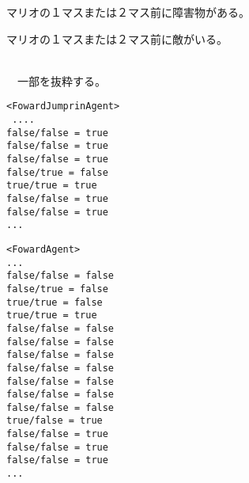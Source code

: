 \documentclass[a4j]{jarticle}
\begin{document}
\begin{description}
\begin{description}
\begin{description}
      \item マリオの１マスまたは２マス前に障害物がある。
      \item マリオの１マスまたは２マス前に敵がいる。
      \end{description}
  \end{description}
\item[(3)]~\\
　一部を抜粋する。
\begin{verbatim}
<FowardJumprinAgent>
 ....
false/false = true
false/false = true
false/false = true
false/true = false
true/true = true
false/false = true
false/false = true
...
\end{verbatim}

\begin{verbatim}
<FowardAgent>
...
false/false = false
false/true = false
true/true = false
true/true = true
false/false = false
false/false = false
false/false = false
false/false = false
false/false = false
false/false = false
false/false = false
true/false = true
false/false = true
false/false = true
false/false = true
...
\end{verbatim}

\end{description}

\end{document}
